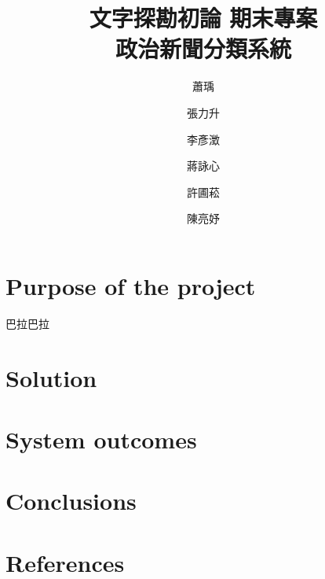 \documentclass[12pt,cleanfoot,twocolumn]{asme2ej}
\title{文字探勘初論 期末專案\\
        政治新聞分類系統}
\author{蕭瑀
\affiliation{
        系級: 資管四\\
        學號: B08705059
}}
\author{張力升
\affiliation{
    系級: 資管三\\
    學號: B09705007
}}
\author{李彥澂
\affiliation{
    系級: 資管三\\
    學號: B09705012
}}
\author{蔣詠心
\affiliation{
    系級: 資管三\\
    學號: B09705020
}}
\author{許圃菘
\affiliation{
        系級: 資管三\\
        學號: B09705027
}}
\author{陳亮妤
\affiliation{
        系級: 資管三\\
        學號: B09705033
}}
\begin{document}
\maketitle

\section{Purpose of the project}
巴拉巴拉
\section{Solution}
\section{System outcomes}
\section{Conclusions}
\section{References}
\end{document}
